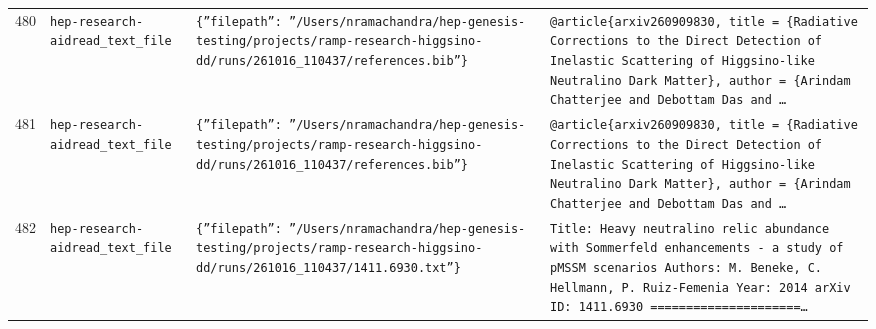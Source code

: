 \documentclass[11pt,a4paper]{article}
\begin{document}
\begin{longtable}{@{}p{}p{}p{}p{}@{}}
480 & \texttt{hep-research-aid}\newline\texttt{read\_\allowbreak{}text\_\allowbreak{}file} & \texttt{\{''filepath'':\allowbreak{} ''/\allowbreak{}Users/\allowbreak{}nramachandra/\allowbreak{}hep-genesis-testing/\allowbreak{}projects/\allowbreak{}ramp-research-higgsino-dd/\allowbreak{}runs/\allowbreak{}261016\_\allowbreak{}110437/\allowbreak{}references.bib''\}\allowbreak{}} & \texttt{@article\{arxiv260909830,\allowbreak{}   title =\allowbreak{} \{Radiative Corrections to the Direct Detection of Inelastic Scattering of Higgsino-like Neutralino Dark Matter\}\allowbreak{},\allowbreak{}   author =\allowbreak{} \{Arindam Chatterjee and Debottam Das and \ldots{}\allowbreak{}} \\
481 & \texttt{hep-research-aid}\newline\texttt{read\_\allowbreak{}text\_\allowbreak{}file} & \texttt{\{''filepath'':\allowbreak{} ''/\allowbreak{}Users/\allowbreak{}nramachandra/\allowbreak{}hep-genesis-testing/\allowbreak{}projects/\allowbreak{}ramp-research-higgsino-dd/\allowbreak{}runs/\allowbreak{}261016\_\allowbreak{}110437/\allowbreak{}references.bib''\}\allowbreak{}} & \texttt{@article\{arxiv260909830,\allowbreak{}   title =\allowbreak{} \{Radiative Corrections to the Direct Detection of Inelastic Scattering of Higgsino-like Neutralino Dark Matter\}\allowbreak{},\allowbreak{}   author =\allowbreak{} \{Arindam Chatterjee and Debottam Das and \ldots{}\allowbreak{}} \\
482 & \texttt{hep-research-aid}\newline\texttt{read\_\allowbreak{}text\_\allowbreak{}file} & \texttt{\{''filepath'':\allowbreak{} ''/\allowbreak{}Users/\allowbreak{}nramachandra/\allowbreak{}hep-genesis-testing/\allowbreak{}projects/\allowbreak{}ramp-research-higgsino-dd/\allowbreak{}runs/\allowbreak{}261016\_\allowbreak{}110437/\allowbreak{}1411.6930.txt''\}\allowbreak{}} & \texttt{Title:\allowbreak{} Heavy neutralino relic abundance with Sommerfeld enhancements - a study of pMSSM scenarios Authors:\allowbreak{} M. Beneke,\allowbreak{} C. Hellmann,\allowbreak{} P. Ruiz-Femenia Year:\allowbreak{} 2014 arXiv ID:\allowbreak{} 1411.6930  =\allowbreak{}=\allowbreak{}=\allowbreak{}=\allowbreak{}=\allowbreak{}=\allowbreak{}=\allowbreak{}=\allowbreak{}=\allowbreak{}=\allowbreak{}=\allowbreak{}=\allowbreak{}=\allowbreak{}=\allowbreak{}=\allowbreak{}=\allowbreak{}=\allowbreak{}=\allowbreak{}=\allowbreak{}=\allowbreak{}=\allowbreak{}\ldots{}\allowbreak{}} \\

\end{longtable}
\end{document}
